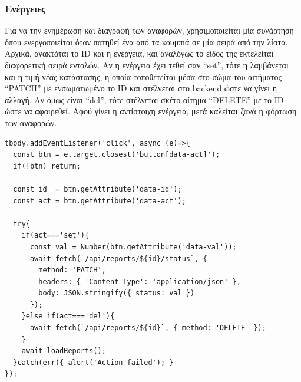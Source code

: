 \subsubsection*{Ενέργειες}
Για να την ενημέρωση και διαγραφή των αναφορών, χρησιμοποιείται μία συνάρτηση όπου ενεργοποιείται όταν πατηθεί ένα από τα κουμπιά σε μία σειρά από την λίστα. Αρχικά, ανακτάται το ID και η ενέργεια, και αναλόγως το είδος της εκτελείται διαφορετική σειρά εντολών. Αν η ενέργεια έχει τεθεί σαν “set”, τότε η λαμβάνεται και η τιμή νέας κατάστασης, η οποία τοποθετείται μέσα στο σώμα του αιτήματος “PATCH” με ενσωματωμένο το ID και στέλνεται στο backend ώστε να γίνει η αλλαγή. Αν όμως είναι “del”, τότε στέλνεται σκέτο αίτημα “DELETE” με το ID ώστε να αφαιρεθεί. Αφού γίνει η αντίστοιχη ενέργεια, μετά καλείται ξανά η φόρτωση των αναφορών.
\\
\begin{lstlisting}
tbody.addEventListener('click', async (e)=>{
  const btn = e.target.closest('button[data-act]');
  if(!btn) return;

  const id  = btn.getAttribute('data-id');
  const act = btn.getAttribute('data-act');

  try{
    if(act==='set'){
      const val = Number(btn.getAttribute('data-val'));
      await fetch(`/api/reports/${id}/status`, {
        method: 'PATCH',
        headers: { 'Content-Type': 'application/json' },
        body: JSON.stringify({ status: val })
      });
    }else if(act==='del'){
      await fetch(`/api/reports/${id}`, { method: 'DELETE' });
    }
    await loadReports();
  }catch(err){ alert('Action failed'); }
});
\end{lstlisting}

